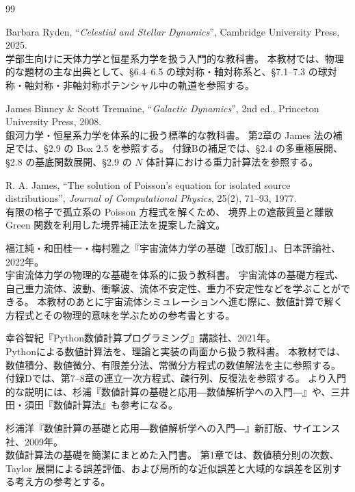 \begin{thebibliography}{99}

Barbara Ryden, ``\textit{Celestial and Stellar Dynamics}'', Cambridge University Press, 2025.\\
学部生向けに天体力学と恒星系力学を扱う入門的な教科書。
本教材では、物理的な題材の主な出典として、§6.4--6.5 の球対称・軸対称系と、§7.1--7.3 の球対称・軸対称・非軸対称ポテンシャル中の軌道を参照する。

James Binney \& Scott Tremaine, ``\textit{Galactic Dynamics}'', 2nd ed., Princeton University Press, 2008.\\
銀河力学・恒星系力学を体系的に扱う標準的な教科書。
第2章の James 法の補足では、§2.9 の Box 2.5 を参照する。
付録Bの補足では、§2.4 の多重極展開、§2.8 の基底関数展開、§2.9 の $N$ 体計算における重力計算法を参照する。

R. A. James, ``The solution of Poisson's equation for isolated source distributions'',
\textit{Journal of Computational Physics}, 25(2), 71--93, 1977.\\
有限の格子で孤立系の Poisson 方程式を解くため、
境界上の遮蔽質量と離散 Green 関数を利用した境界補正法を提案した論文。

福江純・和田桂一・梅村雅之『宇宙流体力学の基礎［改訂版］』、日本評論社、2022年。\\
宇宙流体力学の物理的な基礎を体系的に扱う教科書。
宇宙流体の基礎方程式、自己重力流体、波動、衝撃波、流体不安定性、重力不安定性などを学ぶことができる。
本教材のあとに宇宙流体シミュレーションへ進む際に、数値計算で解く方程式とその物理的意味を学ぶための参考書とする。

幸谷智紀『Python数値計算プログラミング』講談社、2021年。\\
Pythonによる数値計算法を、理論と実装の両面から扱う教科書。
本教材では、数値積分、数値微分、有限差分法、常微分方程式の数値解法を主に参照する。
付録Dでは、第7--8章の連立一次方程式、疎行列、反復法を参照する。
より入門的な説明には、杉浦『数値計算の基礎と応用―数値解析学への入門―』や、三井田・須田『数値計算法』も参考になる。

杉浦洋『数値計算の基礎と応用―数値解析学への入門―』新訂版、サイエンス社、2009年。\\
数値計算法の基礎を簡潔にまとめた入門書。
第1章では、数値積分則の次数、Taylor 展開による誤差評価、および局所的な近似誤差と大域的な誤差を区別する考え方の参考とする。


\end{thebibliography}
